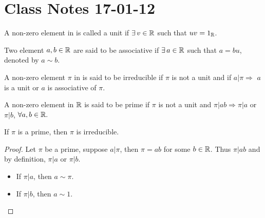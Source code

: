 \documentclass{mynotes}
\begin{document}
\section{Class Notes 17-01-12}
\begin{definition}
A non-zero element in \R{} is called a unit if $\exists\, v\in \mathbb{R}$ such that $uv=1_{\mathbb{R}}$.
\end{definition}
\begin{definition}
Two element $a,b \in\mathbb{R}$ are said to be associative if $\exists\, a\in\mathbb{R}$ such that $a=bu$, denoted by $a\sim b$.
\end{definition}
\begin{definition}
A non-zero element $\pi$ in \R{} is said to be irreducible if $\pi$ is not a unit and if $a|\pi\Rightarrow$ $a$ is a unit or $a$ is associative of $\pi$.
\end{definition}
\begin{definition}
A non-zero element in $\mathbb{R}$ is said to be prime if $\pi$ is not a unit and $\pi| ab\Rightarrow \pi|a$ or $\pi|b$, $\forall a,b\in\mathbb{R}.$
\end{definition}
\begin{proposition}
If $\pi$ is a prime, then $\pi$ is irreducible.
\end{proposition}
\begin{proof}
Let $\pi$ be a prime, suppose $a|\pi$, then $\pi=ab$ for some $b\in\mathbb{R}$. Thus $\pi|ab$ and by definition, $\pi|a$ or $\pi|b$.
\begin{itemize}
\item If $\pi|a$, then $a\sim \pi$.
\item If $\pi|b$, then $a\sim 1$.
\end{itemize}
\end{proof}
\end{document}
